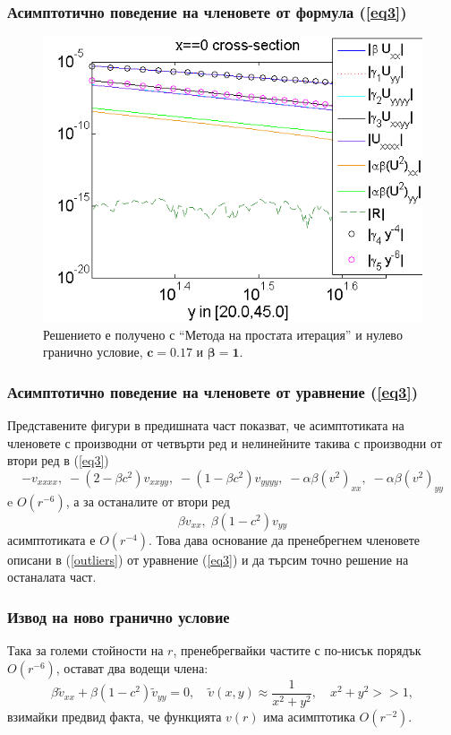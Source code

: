 \documentclass{beamer}
\newcommand{\rf}[1]{(\ref{#1})}
\begin{document}
\begin{frame}
\frametitle{Асимптотично поведение на членовете от формула \rf{eq3}}
\begin{figure}
	\includegraphics[width=0.9\linewidth]{../Thesis/AssymptForEachTerm/c017_bt1_5/ChristovIC_AlongY_50_ZB2_bt1_c017_h020_O(h^6).png}
	\caption{ Решението е получено с ``Метода на простата итерация'' и нулево гранично условие, $\boldsymbol{c=0.17}$ и $\boldsymbol{\beta = 1}$. }
	\label{fig:assympt_c017bt12}
\end{figure}


\end{frame}

\begin{frame}
\frametitle{Асимптотично поведение на членовете от уравнение \rf{eq3}}
Представените фигури в предишната част показват, че асимптотиката на членовете с производни от четвърти ред и нелинейните такива с производни от втори ред в \rf{eq3}
\begin{equation}\label{outliers}
- v_{xxxx}, \;  - (2-\beta c^2)v_{xxyy},  \;  - (1-\beta c^2)v_{yyyy}, \;  - \alpha \beta (v^2)_{xx}, \; - \alpha \beta (v^2)_{yy}
\end{equation}
e $O(r^{-6})$, а за останалите от втори ред
$$
\beta v_{xx}, \; \beta (1-c^2) v_{yy}
$$
асимптотиката е $O(r^{-4})$. Това дава основание да пренебрегнем членовете описани в \rf{outliers} от уравнение \rf{eq3} и да търсим точно решение на останалата част.
\end{frame}

\begin{frame}
\frametitle{Извод на ново гранично условие}
Така за големи стойности на $r$, пренебрегвайки частите с по-нисък порядък $O(r^{-6})$, остават два водещи члена:
\begin{equation}\label{asymptEq}
\beta \tilde v_{xx} + \beta (1-c^2) \tilde v_{yy} =0, \quad \tilde v(x,y) \approx \frac{1}{x^2 + y^2}, \quad x^2 + y^2 >>1,
\end{equation}
взимайки предвид факта, че функцията $v(r)$ има асимптотика $O(r^{-2})$.

\end{frame}
\end{document}
